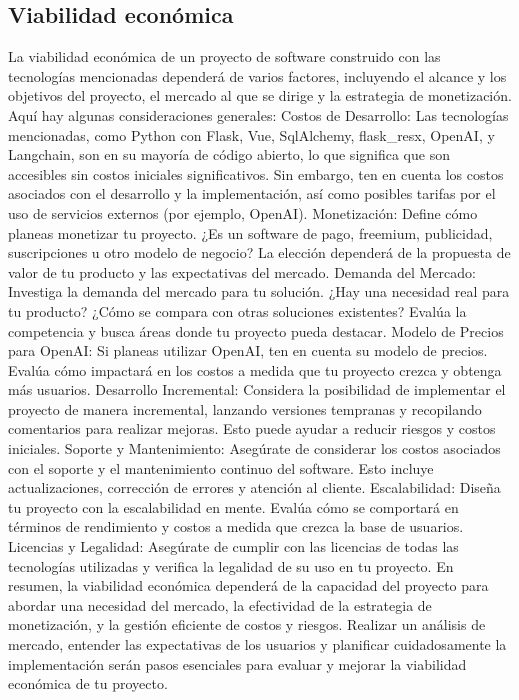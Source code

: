 \subsection{Viabilidad económica}
La viabilidad económica de un proyecto de software construido con las tecnologías mencionadas dependerá de varios factores, incluyendo el alcance y los objetivos del proyecto, el mercado al que se dirige y la estrategia de monetización. Aquí hay algunas consideraciones generales:
Costos de Desarrollo:
Las tecnologías mencionadas, como Python con Flask, Vue, SqlAlchemy, flask_resx, OpenAI, y Langchain, son en su mayoría de código abierto, lo que significa que son accesibles sin costos iniciales significativos. Sin embargo, ten en cuenta los costos asociados con el desarrollo y la implementación, así como posibles tarifas por el uso de servicios externos (por ejemplo, OpenAI).
Monetización:
Define cómo planeas monetizar tu proyecto. ¿Es un software de pago, freemium, publicidad, suscripciones u otro modelo de negocio? La elección dependerá de la propuesta de valor de tu producto y las expectativas del mercado.
Demanda del Mercado:
Investiga la demanda del mercado para tu solución. ¿Hay una necesidad real para tu producto? ¿Cómo se compara con otras soluciones existentes? Evalúa la competencia y busca áreas donde tu proyecto pueda destacar.
Modelo de Precios para OpenAI:
Si planeas utilizar OpenAI, ten en cuenta su modelo de precios. Evalúa cómo impactará en los costos a medida que tu proyecto crezca y obtenga más usuarios.
Desarrollo Incremental:
Considera la posibilidad de implementar el proyecto de manera incremental, lanzando versiones tempranas y recopilando comentarios para realizar mejoras. Esto puede ayudar a reducir riesgos y costos iniciales.
Soporte y Mantenimiento:
Asegúrate de considerar los costos asociados con el soporte y el mantenimiento continuo del software. Esto incluye actualizaciones, corrección de errores y atención al cliente.
Escalabilidad:
Diseña tu proyecto con la escalabilidad en mente. Evalúa cómo se comportará en términos de rendimiento y costos a medida que crezca la base de usuarios.
Licencias y Legalidad:
Asegúrate de cumplir con las licencias de todas las tecnologías utilizadas y verifica la legalidad de su uso en tu proyecto.
En resumen, la viabilidad económica dependerá de la capacidad del proyecto para abordar una necesidad del mercado, la efectividad de la estrategia de monetización, y la gestión eficiente de costos y riesgos. Realizar un análisis de mercado, entender las expectativas de los usuarios y planificar cuidadosamente la implementación serán pasos esenciales para evaluar y mejorar la viabilidad económica de tu proyecto.

